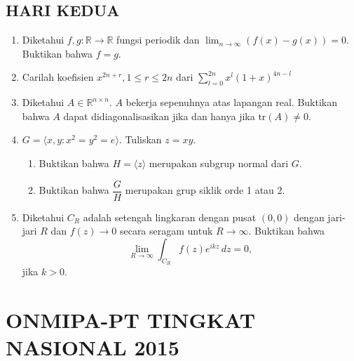 \documentclass[12pt,twoside]{article}
\begin{document}
\subsection{HARI KEDUA}
\begin{enumerate}
    \item Diketahui $f,g:\mathbb{R}\to\mathbb{R}$ fungsi periodik dan $\displaystyle\lim_{n\to\infty}\left(f(x)-g(x)\right)=0$. Buktikan bahwa $f=g$.


    \item Carilah koefisien $x^{2n+r},1\leq r\leq 2n$ dari $\displaystyle\sum_{l=0}^{2n}x^l\left(1+x\right)^{4n-l}$


    \item Diketahui $A\in \mathbb{R}^{n\times n}$. $A$ bekerja sepenuhnya atas lapangan real. Buktikan bahwa $A$ dapat didiagonalisasikan jika dan hanya jika $\text{tr}(A)\neq0$.


    \item $G=\langle x,y:x^2=y^2=e\rangle$. Tuliskan $z=xy$.
          \begin{enumerate}
              \item [(a)] Buktikan bahwa $H=\langle z\rangle$ merupakan subgrup normal dari $G$.
              \item[(b)] Buktikan bahwa $\dfrac{G}{H}$ merupakan grup siklik orde 1 atau 2.

          \end{enumerate}

    \item Diketahui $C_R$ adalah setengah lingkaran dengan pusat $(0,0)$ dengan jari-jari $R$ dan $f(z)\to 0$ secara seragam untuk $R\to\infty$. Buktikan bahwa
          $$\lim_{R\to\infty}\int_{C_R}f(z)e^{ikz}\,dz=0,$$
          jika $k>0$.
\end{enumerate}
\newpage
{}
\section{ONMIPA-PT TINGKAT NASIONAL 2015}
\end{document}
